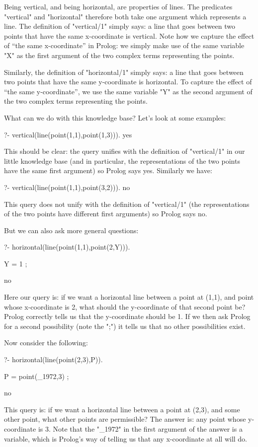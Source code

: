 Being vertical, and being horizontal, are properties of lines. The
predicates "vertical" and "horizontal" therefore both take one
argument which represents a line.  The definition of "vertical/1"
simply says: a line that goes between two points that have the same
x-coordinate is vertical.  Note how we capture the effect of ``the same
x-coordinate'' in Prolog: we simply make use of the same variable "X"
as the first argument of the two complex terms representing the
points.

Similarly, the definition of "horizontal/1" simply says: a line that
goes between two points that have the same y-coordinate is horizontal.
To capture the effect of ``the same y-coordinate'', we use the same
variable "Y" as the second argument of the two complex terms
representing the points.

What can we do with this knowledge base? Let's look at some examples:
\begin{LPNcodedisplay}
?- vertical(line(point(1,1),point(1,3))).
yes
\end{LPNcodedisplay}
%
This should be clear: the query unifies with the definition of
"vertical/1" in our little knowledge base (and in particular, the
representations of the two points have the same first argument) so
Prolog says yes.  Similarly we have:
\begin{LPNcodedisplay}
?- vertical(line(point(1,1),point(3,2))).
no
\end{LPNcodedisplay}
This query does not unify with the definition of "vertical/1" (the
representations of the two points have different first arguments) so
Prolog says no.

But we can also ask more general questions:
\begin{LPNcodedisplay}
?- horizontal(line(point(1,1),point(2,Y))).

Y = 1 ;

no
\end{LPNcodedisplay}
%
Here our query is: if we want a horizontal line between a point at
(1,1), and point whose x-coordinate is 2, what should the y-coordinate
of that second point be?  Prolog correctly tells us that the
y-coordinate should be 1. If we then ask Prolog for a second
possibility (note the ";") it tells us that no other possibilities
exist.

Now consider the following:
\begin{LPNcodedisplay}
?- horizontal(line(point(2,3),P)).

P = point(_1972,3) ;

no
\end{LPNcodedisplay}
%
This query is: if we want a horizontal line between a point at (2,3),
and some other point, what other points are permissible?  The answer
is: any point whose y-coordinate is 3. Note that the "\_1972" in the
first argument of the answer is a variable, which is Prolog's way of
telling us that any x-coordinate at all will do.

